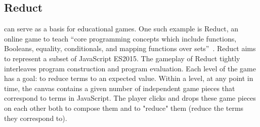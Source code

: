 \subsection{Reduct}
\label{sec:Reduct}


\Nms{} can serve as a basis for educational games.
One such example is Reduct,
an online game to teach ``core programming concepts
which include functions, Booleans, equality, conditionals, and mapping functions over sets''~\cite{arawjoTeachingProgrammingGamified2017}.
Reduct aims to represent a subset of JavaScript ES2015.
The gameplay of Reduct tightly interleaves program construction and program evaluation.
Each level of the game has a goal: to reduce terms to an expected value.
Within a level, at any point in time, the canvas contains a given number of independent
game pieces that correspond to terms in JavaScript.
The player clicks and drops these game pieces on each other both to compose them and to "reduce" them
(reduce the terms they correspond to).


